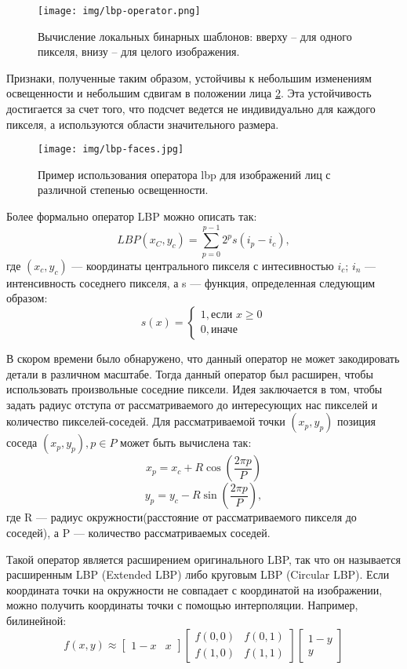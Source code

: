 \documentclass[a4paper,12pt]{report}
\numberwithin{equation}{section}
\begin{document}
\begin{figure}[h!]  \centering
  \texttt{[image: img/lbp-operator.png]}
  \caption{Вычисление локальных бинарных шаблонов: вверху – для одного пикселя,
внизу – для целого изображения.}
  \label{fig:lbp-operator}
\end{figure}

Признаки, полученные таким образом, устойчивы к небольшим изменениям
освещенности и небольшим сдвигам в положении лица \ref{fig:lbp-faces}. Эта
устойчивость достигается за счет того, что подсчет ведется не индивидуально для
каждого пикселя, а используются области значительного размера.

\begin{figure}[h!]  \centering
  \texttt{[image: img/lbp-faces.jpg]}
  \caption{Пример использования оператора lbp для изображений лиц с различной
степенью освещенности.}
  \label{fig:lbp-faces}
\end{figure}

Более формально оператор LBP можно описать так:
\[ LBP(x_C,y_c) = \sum_{p=0}^{p-1}2^ps(i_p-i_c),\] где $(x_c,y_c)$ ---
координаты центрального пикселя с интесивностью $i_c$; $i_n$ --- интенсивность
соседнего пикселя, а s --- функция, определенная следующим образом:
\[ s(x) = \begin{cases} 1, \mbox{если $x \geq 0$} \\ 0, \mbox{иначе}
          \end{cases}
\]

В скором времени было обнаружено, что данный оператор не может закодировать
детали в различном масштабе. Тогда данный оператор был расширен, чтобы
использовать произвольные соседние пиксели. Идея заключается в том, чтобы задать
радиус отступа от рассматриваемого до интересующих нас пикселей и количество
пикселей-соседей. Для рассматриваемой точки $(x_p,y_p)$ позиция соседа
$(x_p,y_p),p \in P$ может быть вычислена так:
\[ x_p = x_c + R\cos(\frac{2\pi p}{P}) \]
\[ y_p = y_c - R\sin(\frac{2\pi p}{P}), \] где R --- радиус
окружности(расстояние от рассматриваемого пикселя до соседей), а P ---
количество рассматриваемых соседей.


Такой оператор является расширением оригинального LBP, так что он называется
расширенным LBP (Extended LBP) либо круговым LBP (Circular LBP). Если координата
точки на окружности не совпадает с координатой на изображении, можно получить
координаты точки с помощью интерполяции. Например, билинейной:
\[ f(x,y) \approx 
\begin{bmatrix} 1 - x & x
\end{bmatrix}
\begin{bmatrix} f(0,0) & f(0,1) \\ f(1,0) & f(1,1)
\end{bmatrix}
\begin{bmatrix} 1 - y \\ y
\end{bmatrix}
\]
\end{document}
